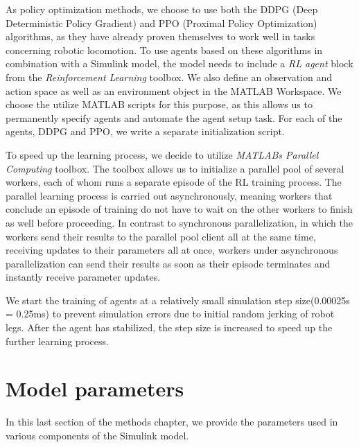 As policy optimization methods, we choose to use both the DDPG (Deep Deterministic Policy Gradient) and PPO (Proximal Policy Optimization) algorithms, as they have already proven themselves to work well in tasks concerning robotic locomotion\parencite{FIND AUTHOR}.
To use agents based on these algorithms in combination with a Simulink model, the model needs to include a \textit{RL agent} block from the \textit{Reinforcement Learning} toolbox.
We also define an observation and action space as well as an environment object in the MATLAB Workspace.
We choose the utilize MATLAB scripts for this purpose, as this allows us to permanently specify agents and automate the agent setup task.
For each of the agents, DDPG and PPO, we write a separate initialization script.

To speed up the learning process, we decide to utilize \textit{MATLABs Parallel Computing} toolbox.
The toolbox allows us to initialize a parallel pool of several workers, each of whom runs a separate episode of the RL training process.
The parallel learning process is carried out asynchronously, meaning workers that conclude an episode of training do not have to wait on the other workers to finish as well before proceeding.
In contrast to synchronous parallelization, in which the workers send their results to the parallel pool client all at the same time, receiving updates to their parameters all at once, workers under asynchronous parallelization can send their results as soon as their episode terminates and instantly receive parameter updates.

We start the training of agents at a relatively small simulation step size(0.00025s = 0.25ms) to prevent simulation errors due to initial random jerking of robot legs.
After the agent has stabilized, the step size is increased to speed up the further learning process.
\cite{lillicrap2015continuous}

\section{Model parameters}
In this last section of the methods chapter, we provide the parameters used in various components of the Simulink model.

